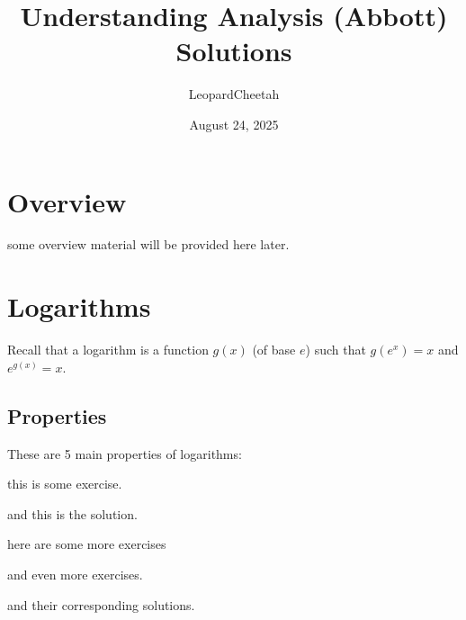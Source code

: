 \documentclass[12pt]{article}
\title{Understanding Analysis (Abbott) Solutions}
\author{LeopardCheetah}
\date{August 24, 2025}
\begin{document}
 
\maketitle
\newpage


\section*{Overview}


some overview material will be provided here later.

\newpage



\section{Logarithms}
Recall that a logarithm is a function \( g(x) \) (of base \( e \)) such that \( g(e^x) = x \) and \( e^{g(x)} = x \).


\subsection{Properties}
These are 5 main properties of logarithms:

\begin{exercise}
    this is some exercise.
\end{exercise}

\begin{solution}
    and this is the solution.
\end{solution}

\begin{exercise}
    here are some more exercises
\end{exercise}
\begin{exercise}
    and even more exercises.
\end{exercise}
\begin{solution}
    and their corresponding solutions.
\end{solution}
\end{document}
